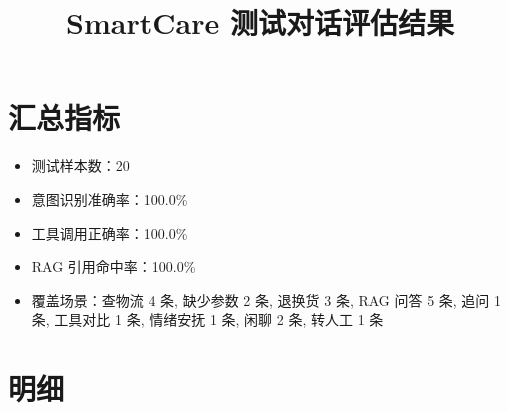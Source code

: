 \documentclass[12pt,a4paper]{ctexart}
\title{SmartCare 测试对话评估结果}
\author{}
\date{}
\begin{document}
\maketitle

\section{汇总指标}

\begin{itemize}
    \item 测试样本数：20
    \item 意图识别准确率：100.0\%
    \item 工具调用正确率：100.0\%
    \item RAG 引用命中率：100.0\%
    \item 覆盖场景：查物流 4 条, 缺少参数 2 条, 退换货 3 条, RAG 问答 5 条, 追问 1 条, 工具对比 1 条, 情绪安抚 1 条, 闲聊 2 条, 转人工 1 条
\end{itemize}

\section{明细}
\end{document}
